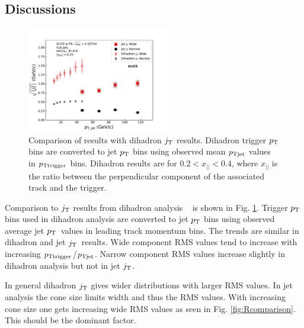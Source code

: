 \FloatBarrier

\subsection{Discussions}
\begin{figure}[htb]
\centering
\includegraphics[width=0.55\textwidth]{figures/results/RMSWithSystematics_DihadronJetPt}

\caption{Comparison of results with dihadron $j_{\rm T}$ results. Dihadron trigger $p_{\rm T}$ bins are converted to jet $p_{\rm T}$  bins  using observed mean  $p_{\rm Tjet}$ values in $p_{\rm Ttrigger}$ bins. Dihadron results are for $0.2 < x_{||} < 0.4$, where $x_{||}$ is the ratio between the perpendicular component of the associated track and the trigger. }
\label{fig:DihadronComparison}
\end{figure}

Comparison to $j_{\rm T}$ results from dihadron analysis ~\cite{ALICEjt} is shown in Fig. \ref{fig:DihadronComparison}. Trigger $p_{\rm T}$ bins used in dihadron analysis are converted to jet $p_{\rm T}$ bins using observed average jet $p_{\rm T}$ values in leading track momentum bins. %
The trends are similar in dihadron and jet $j_{\rm T}$ results. Wide component RMS values tend to increase with increasing $p_{\rm Ttrigger}$/$p_{\rm Tjet}$. Narrow component RMS values increase slightly in dihadron analysis but not in jet $j_{\rm T}$. 

In general dihadron $j_{\rm T}$ gives wider distributions with larger RMS values. In jet analysis the cone size limits width and thus the RMS values. With increasing cone size one gets increasing wide RMS values as seen in Fig. \ref{fig:Rcomparison}. This should be the dominant factor.

